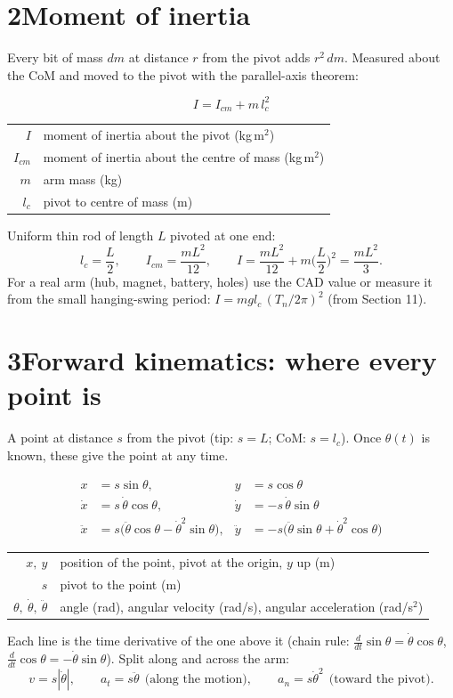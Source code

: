 \documentclass[11pt]{article}
\makeatletter
\newcommand{\where}[1]{\par\vspace{-2pt}{\small\color{muted}\textit{where}}\par\vspace{-2pt}
  {\small\renewcommand{\arraystretch}{1.08}\begin{tabular}{@{}>{$}r<{$}@{\;\;}l@{}}#1\end{tabular}}}
\makeatother
\begin{document}
\newpage
\section*{2\quad Moment of inertia}
Every bit of mass $dm$ at distance $r$ from the pivot adds $r^2\,dm$. Measured about the CoM and moved to the pivot with the parallel-axis theorem:
\begin{result}
\begin{equation}
I = I_{cm} + m\,l_c^2
\end{equation}
\where{I & moment of inertia about the pivot (kg\,m$^2$)\\ I_{cm} & moment of inertia about the centre of mass (kg\,m$^2$)\\ m & arm mass (kg)\\ l_c & pivot to centre of mass (m)}
\end{result}
Uniform thin rod of length $L$ pivoted at one end:
\begin{equation}
l_c=\frac{L}{2},\qquad I_{cm}=\frac{mL^2}{12},\qquad I=\frac{mL^2}{12}+m\Big(\frac{L}{2}\Big)^2=\frac{mL^2}{3}.
\end{equation}
For a real arm (hub, magnet, battery, holes) use the CAD value or measure it from the small hanging-swing period: $I = m g l_c\,(T_n/2\pi)^2$ (from Section 11).

\section*{3\quad Forward kinematics: where every point is}
A point at distance $s$ from the pivot (tip: $s=L$; CoM: $s=l_c$). Once $\theta(t)$ is known, these give the point at any time.
\begin{result}
\begin{align}
x &= s\sin\theta, & y &= s\cos\theta \label{eq:pos}\\
\dot x &= s\,\dot\theta\cos\theta, & \dot y &= -s\,\dot\theta\sin\theta \label{eq:vel}\\
\ddot x &= s\big(\ddot\theta\cos\theta-\dot\theta^2\sin\theta\big), & \ddot y &= -s\big(\ddot\theta\sin\theta+\dot\theta^2\cos\theta\big) \label{eq:acc}
\end{align}
\where{x,\ y & position of the point, pivot at the origin, $y$ up (m)\\ s & pivot to the point (m)\\ \theta,\ \dot\theta,\ \ddot\theta & angle (rad), angular velocity (rad/s), angular acceleration (rad/s$^2$)}
\end{result}
Each line is the time derivative of the one above it (chain rule: $\tfrac{d}{dt}\sin\theta=\dot\theta\cos\theta$, $\tfrac{d}{dt}\cos\theta=-\dot\theta\sin\theta$).
Split along and across the arm:
\begin{equation}
v = s|\dot\theta|,\qquad a_t = s\ddot\theta\ \ \text{(along the motion)},\qquad a_n = s\dot\theta^2\ \ \text{(toward the pivot)}.
\end{equation}
\end{document}
